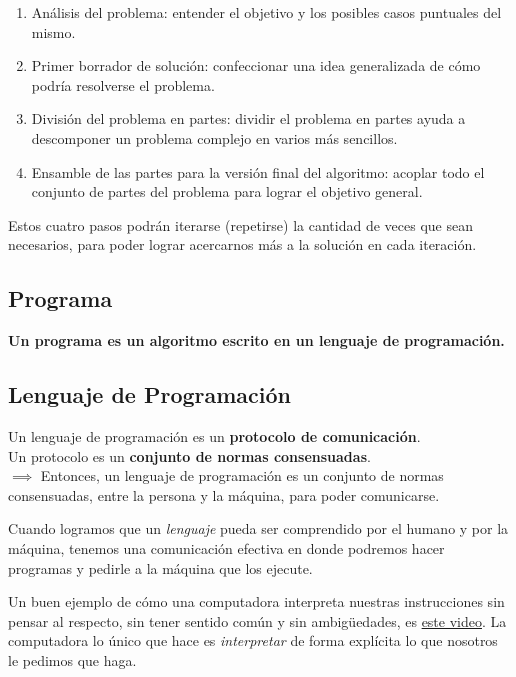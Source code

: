 \documentclass[
  letterpaper,
  DIV=11,
  numbers=noendperiod]{scrreprt}
\providecommand{\tightlist}{%
  \setlength{\itemsep}{0pt}\setlength{\parskip}{0pt}}\usepackage{longtable,booktabs,array}
\begin{document}
\begin{enumerate}
\def\labelenumi{\arabic{enumi}.}
\tightlist
\item
  Análisis del problema: entender el objetivo y los posibles casos
  puntuales del mismo.\\
\item
  Primer borrador de solución: confeccionar una idea generalizada de
  cómo podría resolverse el problema.\\
\item
  División del problema en partes: dividir el problema en partes ayuda a
  descomponer un problema complejo en varios más sencillos.\\
\item
  Ensamble de las partes para la versión final del algoritmo: acoplar
  todo el conjunto de partes del problema para lograr el objetivo
  general.\\
\end{enumerate}

Estos cuatro pasos podrán iterarse (repetirse) la cantidad de veces que
sean necesarios, para poder lograr acercarnos más a la solución en cada
iteración.

\subsection{Programa}\label{programa}

\textbf{Un programa es un algoritmo escrito en un lenguaje de
programación.}

\subsection{Lenguaje de Programación}\label{lenguaje-de-programaciuxf3n}

Un lenguaje de programación es un \textbf{protocolo de comunicación}.\\
Un protocolo es un \textbf{conjunto de normas consensuadas}.\\
\(\implies\) Entonces, un lenguaje de programación es un conjunto de
normas consensuadas, entre la persona y la máquina, para poder
comunicarse.

Cuando logramos que un \emph{lenguaje} pueda ser comprendido por el
humano y por la máquina, tenemos una comunicación efectiva en donde
podremos hacer programas y pedirle a la máquina que los ejecute.

Un buen ejemplo de cómo una computadora interpreta nuestras
instrucciones sin pensar al respecto, sin tener sentido común y sin
ambigüedades, es \href{https://www.youtube.com/watch?v=cDA3_5982h8}{este
video}. La computadora lo único que hace es \emph{interpretar} de forma
explícita lo que nosotros le pedimos que haga.
\end{document}
